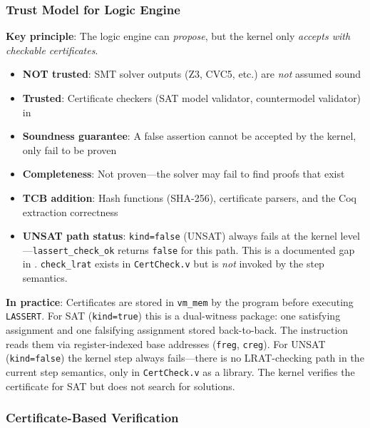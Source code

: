 \subsubsection{Trust Model for Logic Engine}

\begin{tcolorbox}[colback=red!5!white,colframe=red!75!black,title=\textbf{What is Trusted in Logic Engine L}]
\textbf{Key principle}: The logic engine can \emph{propose}, but the kernel only \emph{accepts with checkable certificates}.

\begin{itemize}
    \item \textbf{NOT trusted}: SMT solver outputs (Z3, CVC5, etc.) are \emph{not} assumed sound
    \item \textbf{Trusted}: Certificate checkers (SAT model validator, countermodel validator) in 
    \item \textbf{Soundness guarantee}: A false assertion cannot be accepted by the kernel, only fail to be proven
    \item \textbf{Completeness}: Not proven---the solver may fail to find proofs that exist
    \item \textbf{TCB addition}: Hash functions (SHA-256), certificate parsers, and the Coq extraction correctness
    \item \textbf{UNSAT path status}: \texttt{kind=false} (UNSAT) always fails at the kernel level---\texttt{lassert\_check\_ok} returns \texttt{false} for this path. This is a documented gap in . \texttt{check\_lrat} exists in \texttt{CertCheck.v} but is \emph{not} invoked by the step semantics.
\end{itemize}

\textbf{In practice}: Certificates are stored in \texttt{vm\_mem} by the program before executing \texttt{LASSERT}. For SAT (\texttt{kind=true}) this is a dual-witness package: one satisfying assignment and one falsifying assignment stored back-to-back. The instruction reads them via register-indexed base addresses (\texttt{freg}, \texttt{creg}). For UNSAT (\texttt{kind=false}) the kernel step always fails---there is no LRAT-checking path in the current step semantics, only in \texttt{CertCheck.v} as a library. The kernel verifies the certificate for SAT but does not search for solutions.
\end{tcolorbox}

\subsubsection{Certificate-Based Verification}

